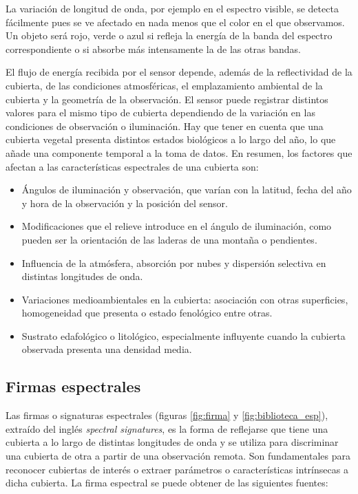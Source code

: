 La variación de longitud de onda, por ejemplo en el espectro visible, se detecta fácilmente pues se ve afectado en nada menos que el color en el que observamos. Un objeto será rojo, verde o azul si refleja la energía de la banda del espectro correspondiente o si absorbe más intensamente la de las otras bandas.\Sep

El flujo de energía recibida por el sensor depende, además de la reflectividad de la cubierta, de las condiciones atmosféricas, el emplazamiento ambiental de la cubierta y la geometría de la observación. El sensor puede registrar distintos valores para el mismo tipo de cubierta dependiendo de la variación en las condiciones de observación o iluminación. Hay que tener en cuenta que una cubierta vegetal presenta distintos estados biológicos a lo largo del año, lo que añade una componente temporal a la toma de datos. En resumen, los factores que afectan a las características espectrales de una cubierta son:
\begin{itemize}
	\item Ángulos de iluminación y observación, que varían con la latitud, fecha del año y hora de la observación y la posición del sensor.
	\item Modificaciones que el relieve introduce en el ángulo de iluminación, como pueden ser la orientación de las laderas de una montaña o pendientes.
	\item Influencia de la atmósfera, absorción por nubes y dispersión selectiva en distintas longitudes de onda.
	\item Variaciones medioambientales en la cubierta: asociación con otras superficies, homogeneidad que presenta o estado fenológico entre otras.
	\item Sustrato edafológico o litológico, especialmente influyente cuando la cubierta observada presenta una densidad media.
\end{itemize}

\subsection{Firmas espectrales}
Las firmas o signaturas espectrales (figuras \ref{fig:firma} y \ref{fig:biblioteca_esp}), extraído del inglés \textit{spectral signatures}, es la forma de reflejarse que tiene una cubierta a lo largo de distintas longitudes de onda y se utiliza para discriminar una cubierta de otra a partir de una observación remota. Son fundamentales para reconocer cubiertas de interés o extraer parámetros o características intrínsecas a dicha cubierta. La firma espectral se puede obtener de las siguientes fuentes:

